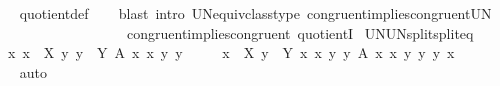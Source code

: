 \begin{isabellebody}
%
\isadelimproof
\ \ %
\endisadelimproof
%
\isatagproof
{}\isamarkupfalse%
\ quotient{\isacharunderscore}{\kern0pt}def\isanewline
\ \ \isamarkupfalse%
\ {\isacharparenleft}{\kern0pt}blast\ intro{\isacharcolon}{\kern0pt}\ UN{\isacharunderscore}{\kern0pt}equiv{\isacharunderscore}{\kern0pt}class{\isacharunderscore}{\kern0pt}type\ congruent{}{\isacharunderscore}{\kern0pt}implies{\isacharunderscore}{\kern0pt}congruent{\isacharunderscore}{\kern0pt}UN\isanewline
\ \ \ \ \ \ \ \ \ \ \ \ \ \ \ \ \ \ \ congruent{}{\isacharunderscore}{\kern0pt}implies{\isacharunderscore}{\kern0pt}congruent\ quotientI{\isacharparenright}{\kern0pt}%
\endisatagproof
{\isafoldproof}%
%
\isadelimproof
\isanewline
%
\endisadelimproof
\isanewline
\isanewline
{}\isamarkupfalse%
\ UN{\isacharunderscore}{\kern0pt}UN{\isacharunderscore}{\kern0pt}split{\isacharunderscore}{\kern0pt}split{\isacharunderscore}{\kern0pt}eq{\isacharcolon}{\kern0pt}\isanewline
\ \ {\isachardoublequoteopen}{\isacharparenleft}{\kern0pt}{\isasymUnion}{\isacharparenleft}{\kern0pt}x{}{\isacharcomma}{\kern0pt}\ x{}{\isacharparenright}{\kern0pt}\ {\isasymin}\ X{\isachardot}{\kern0pt}\ {\isasymUnion}{\isacharparenleft}{\kern0pt}y{}{\isacharcomma}{\kern0pt}\ y{}{\isacharparenright}{\kern0pt}\ {\isasymin}\ Y{\isachardot}{\kern0pt}\ A\ x{}\ x{}\ y{}\ y{}{\isacharparenright}{\kern0pt}\ {\isacharequal}{\kern0pt}\isanewline
\ \ \ \ {\isacharparenleft}{\kern0pt}{\isasymUnion}x\ {\isasymin}\ X{\isachardot}{\kern0pt}\ {\isasymUnion}y\ {\isasymin}\ Y{\isachardot}{\kern0pt}\ {\isacharparenleft}{\kern0pt}{\isasymlambda}{\isacharparenleft}{\kern0pt}x{}{\isacharcomma}{\kern0pt}\ x{}{\isacharparenright}{\kern0pt}{\isachardot}{\kern0pt}\ {\isacharparenleft}{\kern0pt}{\isasymlambda}{\isacharparenleft}{\kern0pt}y{}{\isacharcomma}{\kern0pt}\ y{}{\isacharparenright}{\kern0pt}{\isachardot}{\kern0pt}\ A\ x{}\ x{}\ y{}\ y{}{\isacharparenright}{\kern0pt}\ y{\isacharparenright}{\kern0pt}\ x{\isacharparenright}{\kern0pt}{\isachardoublequoteclose}\isanewline
\ \ %
\isanewline
\ \ %
\isanewline
%
\isadelimproof
\ \ %
\endisadelimproof
%
\isatagproof
{}\isamarkupfalse%
\ auto%
\endisatagproof
{\isafoldproof}%
%
\isadelimproof
\isanewline
%
\endisadelimproof
\isanewline

\end{isabellebody}

